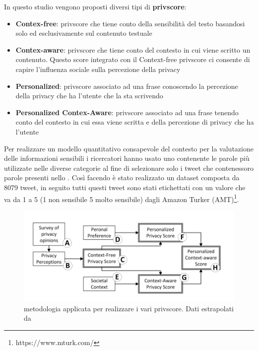 In questo studio vengono proposti diversi tipi di \textbf{privscore}:
\begin{itemize}
    \item \textbf{Contex-free}: privscore che tiene conto della sensibilità del testo basandosi solo ed esclusivamente sul contenuto testuale
    \item \textbf{Contex-aware}: privscore che tiene conto del contesto in cui viene scritto un contenuto. Questo score integrato con il Context-free privscore ci consente di capire l’influenza sociale sulla percezione della privacy
    \item \textbf{Personalized}: privscore associato ad una frase conoscendo la percezione della privacy che ha l'utente che la sta scrivendo
    \item \textbf{Personalized Contex-Aware}: privscore associato ad una frase tenendo conto del contesto in cui essa viene scritta e della percezione di privacy che ha l'utente
\end{itemize}

Per realizzare un modello quantitativo consapevole del contesto per la valutazione delle informazioni sensibili i ricercatori hanno usato uno  contenente le parole più utilizzate nelle diverse categorie al fine di selezionare solo i tweet che contenessoro parole presenti nello . Così facendo è stato realizzato un dataset composta da 8079 tweet, in seguito tutti questi tweet sono stati etichettati con un valore che va da 1 a 5 (1 non sensibile 5 molto sensibile) dagli Amazon Turker (AMT)\footnote{https://www.mturk.com/}.


\begin{figure}[h!t]
    \centering
    \includegraphics[width=15cm]{Figure/related_work/mtd-dontTweet.png}
    \caption{metodologia applicata per realizzare i vari privscore. Dati estrapolati da\cite{dontTweetThis}}
    \label{fig:mtd-dontTweetThis}
\end{figure}
\FloatBarrier

